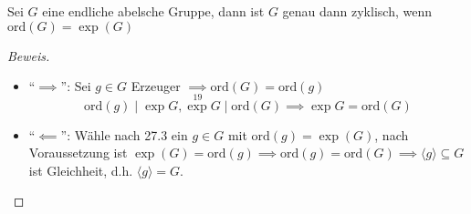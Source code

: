 \documentclass[a4paper]{report}
\begin{document}
\begin{satz}
Sei $G$ eine endliche abelsche Gruppe, dann ist $G$ genau dann zyklisch, wenn $\mathrm{ord}(G) = \exp(G)$
\begin{proof}[Beweis] \item
\begin{itemize}
\item ``$\implies$'': Sei $g \in G$ Erzeuger $\underset{19}\implies \mathrm{ord}(G) = \mathrm{ord}(g)$
$$\mathrm{ord}(g) \mid \exp G, \exp G \mid \mathrm{ord}(G) \implies \exp G = \mathrm{ord}(G)$$
\item ``$\impliedby$'': Wähle nach 27.3 ein $g \in G$ mit $\mathrm{ord}(g) = \exp(G)$, nach Voraussetzung ist $\exp(G) = \mathrm{ord}(g) \implies \mathrm{ord}(g) = \mathrm{ord}(G) \implies \langle g \rangle \subseteq G$ ist Gleichheit, d.h. $\langle g \rangle = G.$
\end{itemize}
\end{proof}
\end{satz}
\end{document}
